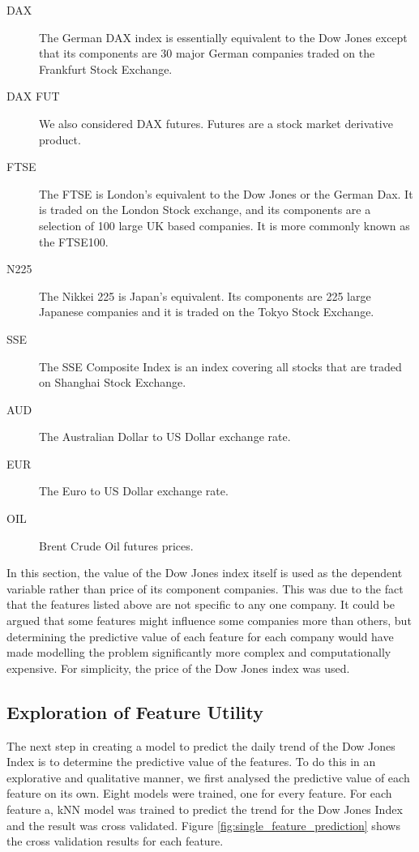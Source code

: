 \documentclass{report}
\begin{document}
\begin{description}
  \item[DAX] The German DAX index is essentially equivalent to the Dow Jones except that its components are 30 major German companies traded on the Frankfurt Stock Exchange.
  
  \item[DAX FUT] We also considered DAX futures. Futures are a stock market derivative product.
  
  \item[FTSE] The FTSE is London's equivalent to the Dow Jones or the German Dax. It is traded on the London Stock exchange, and its components are a selection of 100 large UK based companies. It is more commonly known as the FTSE100.
  
  \item[N225] The Nikkei 225 is Japan's equivalent. Its components are 225 large Japanese companies and it is traded on the Tokyo Stock Exchange.
  
  \item[SSE] The SSE Composite Index is an index covering all stocks that are traded on Shanghai Stock Exchange. 
  
  \item[AUD] The Australian Dollar to US Dollar exchange rate.
  
  \item[EUR] The Euro to US Dollar exchange rate.
  
  \item[OIL] Brent Crude Oil futures prices.
      
\end{description}

In this section, the value of the Dow Jones index itself is used as the dependent variable rather than price of its component companies. This was due to the fact that the features listed above are not specific to any one company. It could be argued that some features might influence some companies more than others, but determining the predictive value of each feature for each company would have made modelling the problem significantly more complex and computationally expensive. For simplicity, the price of the Dow Jones index was used.

\subsection{Exploration of Feature Utility}

The next step in creating a model to predict the daily trend of the Dow Jones Index is to determine the predictive value of the features. To do this in an explorative and qualitative manner, we first analysed the predictive value of each feature on its own. Eight models were trained, one for every feature. For each feature a, kNN model was trained to predict the trend for the Dow Jones Index and the result was cross validated. Figure \ref{fig:single_feature_prediction} shows the cross validation results for each feature.
\end{document}
